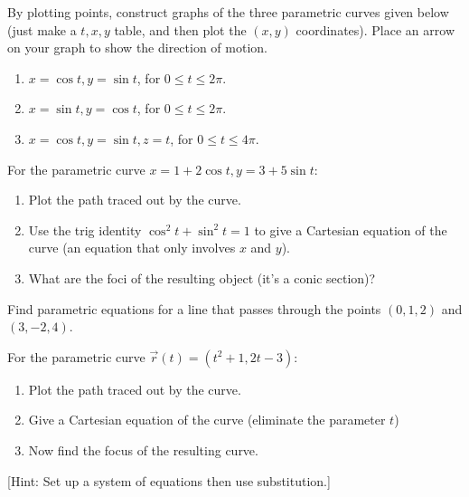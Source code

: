 \begin{problem}
By plotting points, construct graphs of the three parametric curves given below (just make a $t,x,y$ table, and then plot the $(x,y)$ coordinates).  Place an arrow on your graph to show the direction of motion.
\begin{enumerate}
\item $x=\cos t, y=\sin t$, for $0\leq t\leq 2\pi$.
\item $x=\sin t, y=\cos t$, for $0\leq t\leq 2\pi$.
\item $x=\cos t, y=\sin t, z=t$, for $0\leq t\leq 4\pi$.
\end{enumerate} 
\end{problem}

\begin{problem}
For the parametric curve $x=1+2\cos t, y=3+5\sin t$:
\begin{enumerate}
	\item Plot the path traced out by the curve.
	\item Use the trig identity $\cos^2t+\sin^2t=1$ to give a Cartesian equation of the curve (an equation that only involves $x$ and $y$). 
	\item What are the foci of the resulting object (it's a conic section)?
\end{enumerate}
\end{problem}

\begin{problem}\label{prob:line equation practice}
Find parametric equations for a line that passes through the points $(0,1,2)$ and $(3,-2,4)$.
\end{problem}

\begin{problem}
For the parametric curve $\vec r(t)= (t^2+1, 2t-3)$: 
\begin{enumerate}
	\item Plot the path traced out by the curve.
	\item Give a Cartesian equation of the curve (eliminate the parameter $t$)
	\item Now find the focus of the resulting curve.
\end{enumerate}
[Hint: Set up a system of equations then use substitution.]
\end{problem}

